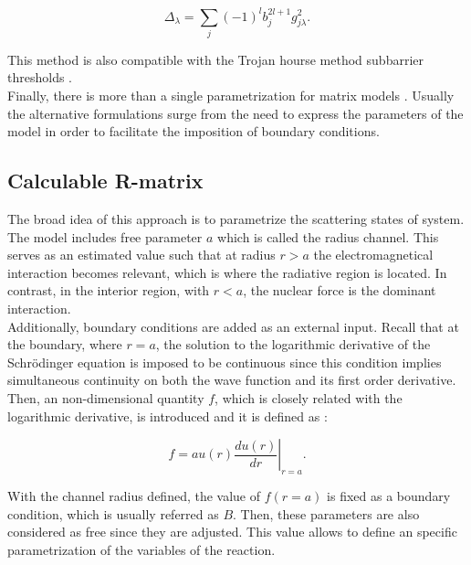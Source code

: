 \documentclass[openany]{book}
\begin{document}
\begin{equation}\label{eq:rmatrix_kmatrix_shift}
	\Delta_\lambda = \sum_{j} (-1)^l b^{2l + 1}_j g^2_{j\lambda}.
\end{equation}


This method is also compatible with the Trojan hourse method subbarrier thresholds \cite{mukhamedzhanov_shubhchintak_bertulani_2017}. \\

Finally, there is more than a single parametrization for matrix models \cite{brune_2002}. Usually the alternative formulations surge from the need to express the parameters of the model in order to facilitate the imposition of boundary conditions.  

\subsection{Calculable R-matrix} \label{sub:rmatrix_calculable}

The broad idea of this approach is to parametrize the scattering states of system.  The model includes free parameter $a$ which is called the radius channel. This serves as an estimated value such that at radius $r > a$ the electromagnetical interaction becomes relevant, which is where the radiative region is located. In contrast, in the interior region, with $r < a$, the nuclear force is the dominant interaction. \\

Additionally, boundary conditions are added as an external input. Recall that at the boundary, where $r = a$, the solution to the logarithmic derivative of the Schrödinger equation is imposed to be continuous since this condition implies simultaneous continuity on both the wave function and its first order derivative. Then, an non-dimensional quantity $f$, which is closely related with the logarithmic derivative, is introduced and it is defined as \cite{iliadis_2015}:

\begin{equation}\label{eq:rmatrix_f}
	f = a\left.u(r) \frac{du(r)}{dr}\right|_{r = a}.
\end{equation}

With the channel radius defined, the value of $f(r = a)$ is fixed as a boundary condition, which is usually referred as $B$.  Then, these parameters are also considered as free since they are adjusted. This value allows to define an specific parametrization of the variables of the reaction. \\
\end{document}
